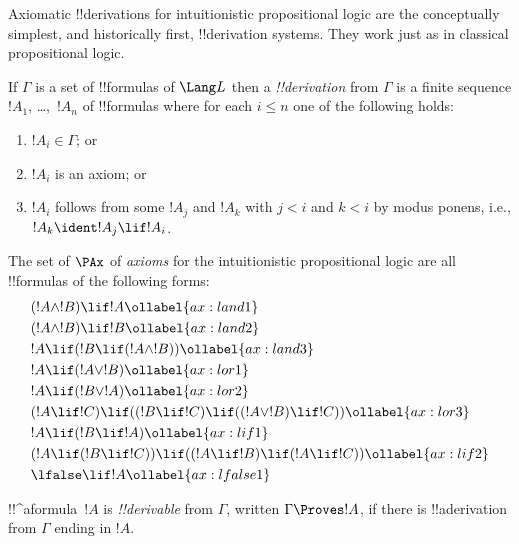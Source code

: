 \documentclass[../../../include/open-logic-section]{subfiles}
\begin{document}

Axiomatic !!{derivation}s for intuitionistic propositional logic are
the conceptually simplest, and historically first, !!{derivation}
systems. They work just as in classical propositional logic.

\begin{defn}[!!^{derivability}]
If $\Gamma$ is a set of !!{formula}s of $\Lang L$ then a
\emph{!!{derivation}} from $\Gamma$ is a finite sequence $!A_1$,
\dots,~$!A_n$ of !!{formula}s where for each $i \le n$ one of the
following holds:
\begin{enumerate}
\item $!A_i \in \Gamma$; or
\item $!A_i$ is an axiom; or
\item $!A_i$ follows from some $!A_j$ and $!A_k$ with $j < i$ and $k <
  i$ by modus ponens, i.e., $!A_k \ident !A_j \lif !A_i$.
\end{enumerate}
\end{defn}

\begin{defn}[Axioms]
The set of $\PAx$ of \emph{axioms} for the intuitionistic propositional logic 
are all !!{formula}s of the following forms:
\begin{align}
  & (!A \land !B) \lif !A \ollabel{ax:land1}\\
  & (!A \land !B) \lif !B \ollabel{ax:land2}\\
  & !A \lif (!B \lif (!A \land !B)) \ollabel{ax:land3}\\
  & !A \lif (!A \lor !B) \ollabel{ax:lor1}\\
  & !A \lif (!B \lor !A) \ollabel{ax:lor2}\\
  & (!A \lif !C) \lif ((!B \lif !C) \lif ((!A \lor !B) \lif !C)) \ollabel{ax:lor3}\\
  & !A \lif (!B \lif !A) \ollabel{ax:lif1}\\
  & (!A \lif (!B \lif !C)) \lif ((!A \lif !B) \lif (!A \lif !C)) \ollabel{ax:lif2}\\
  & \lfalse \lif !A \ollabel{ax:lfalse1}
\end{align}
\end{defn}

\begin{defn}[!!^{derivability}]
!!^a{formula}~$!A$ is \emph{!!{derivable}} from $\Gamma$, written
$\Gamma \Proves !A$, if there is !!a{derivation} from $\Gamma$ ending
in $!A$.
\end{defn}
\end{document}
